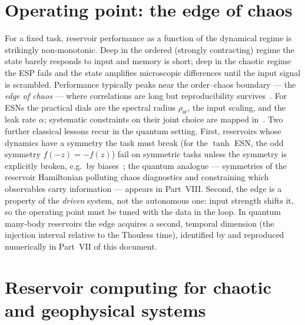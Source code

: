 \section{Operating point: the edge of chaos}
\label{sec:edge-of-chaos}

For a fixed task, reservoir performance as a function of the dynamical regime
is strikingly non-monotonic. Deep in the ordered (strongly contracting) regime
the state barely responds to input and memory is short; deep in the chaotic
regime the ESP fails and the state amplifies microscopic differences until the
input signal is scrambled. Performance typically peaks near the
order--chaos boundary --- the \emph{edge of chaos} --- where correlations are long
but reproducibility survives~\citep{boedecker2012information}. For ESNs the
practical dials are the spectral radius $\rho_{\mathrm{sr}}$, the input
scaling, and the leak rate $\alpha$; systematic constraints on their joint
choice are mapped in~\citet{storm2022constraints}. Two further classical
lessons recur in the quantum setting. First, reservoirs whose dynamics have a
symmetry the task must break (for the $\tanh$ ESN, the odd symmetry
$f(-z)=-f(z)$) fail on symmetric tasks unless the symmetry is explicitly
broken, e.g.\ by biases~\citep{herteux2020breaking}; the quantum analogue ---
symmetries of the reservoir Hamiltonian polluting chaos diagnostics and
constraining which observables carry information --- appears in Part~VIII.
Second, the edge is a property of the \emph{driven} system, not the autonomous
one: input strength shifts it, so the operating point must be tuned with the
data in the loop. In quantum many-body reservoirs the edge acquires a second,
temporal dimension (the injection interval relative to the Thouless time),
identified by \citet{kobayashi2026edge} and reproduced numerically in Part~VII
of this document.

\section{Reservoir computing for chaotic and geophysical systems}
\label{sec:rc-chaos}

